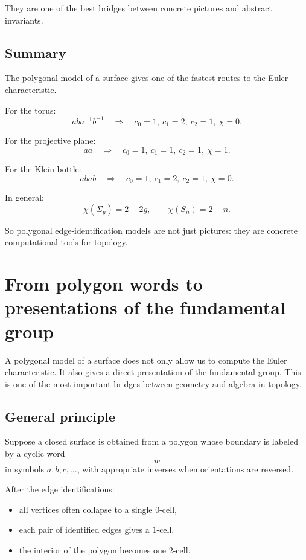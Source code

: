 \documentclass[12pt,a4paper]{article}
\theoremstyle{notespace}
\begin{document}
They are one of the best bridges between concrete pictures and abstract invariants.

\subsection{Summary}

The polygonal model of a surface gives one of the fastest routes to the Euler characteristic.

For the torus:
\[
aba^{-1}b^{-1}\quad \Longrightarrow \quad c_0=1,\ c_1=2,\ c_2=1,\ \chi=0.
\]

For the projective plane:
\[
aa\quad \Longrightarrow \quad c_0=1,\ c_1=1,\ c_2=1,\ \chi=1.
\]

For the Klein bottle:
\[
abab\quad \Longrightarrow \quad c_0=1,\ c_1=2,\ c_2=1,\ \chi=0.
\]

In general:
\[
\chi(\Sigma_g)=2-2g,\qquad \chi(S_n)=2-n.
\]

So polygonal edge-identification models are not just pictures: they are concrete computational tools for topology.

\section{From polygon words to presentations of the fundamental group}

A polygonal model of a surface does not only allow us to compute the Euler characteristic. It also gives a direct presentation of the fundamental group. This is one of the most important bridges between geometry and algebra in topology.

\subsection{General principle}

Suppose a closed surface is obtained from a polygon whose boundary is labeled by a cyclic word
\[
w
\]
in symbols \(a,b,c,\dots\), with appropriate inverses when orientations are reversed.

After the edge identifications:
\begin{itemize}
	\item all vertices often collapse to a single \(0\)-cell,
	\item each pair of identified edges gives a \(1\)-cell,
	\item the interior of the polygon becomes one \(2\)-cell.
\end{itemize}
\end{document}
